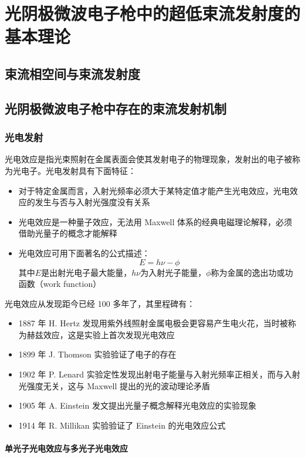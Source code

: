 \chapter{光阴极微波电子枪中的超低束流发射度的基本理论}
\label{chap:theory}

\section{束流相空间与束流发射度}

\section{光阴极微波电子枪中存在的束流发射机制}

\subsection{光电发射}
光电效应是指光束照射在金属表面会使其发射电子的物理现象，发射出的电子被称为光电子。光电发射具有下面特征：
\begin{itemize}
	\item 对于特定金属而言，入射光频率必须大于某特定值才能产生光电效应，光电效应的发生与否与入射光强度没有关系
	\item 光电效应是一种量子效应，无法用 Maxwell 体系的经典电磁理论解释，必须借助光量子的概念才能解释
	\item 光电效应可用下面著名的公式描述：
		\[
		E = h\nu-\phi
		\]
	其中$E$是出射光电子最大能量，$h\nu$为入射光子能量，$\phi$称为金属的逸出功或功函数（work function）
\end{itemize}

光电效应从发现距今已经 100 多年了，其里程碑有：
\begin{itemize}
  \item 1887 年 H. Hertz 发现用紫外线照射金属电极会更容易产生电火花，当时被称为赫兹效应，这是实验上首次发现光电效应
  \item 1899 年 J. Thomson 实验验证了电子的存在
  \item 1902 年 P. Lenard 实验定性发现出射电子能量与入射光频率正相关，而与入射光强度无关，这与 Maxwell 提出的光的波动理论矛盾
  \item 1905 年 A. Einstein 发文提出光量子概念解释光电效应的实验现象
  \item 1914 年 R. Millikan 实验验证了 Einstein 的光电效应公式
\end{itemize}

\subsubsection{单光子光电效应与多光子光电效应}
